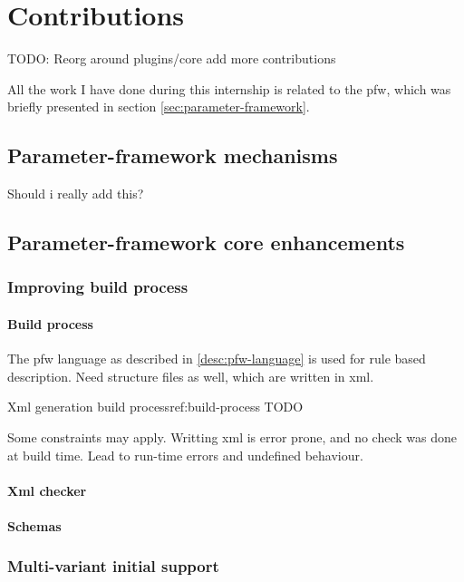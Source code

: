 \chapter{Contributions}\label{chap:contributions}

TODO:
Reorg around plugins/core add more contributions

\begin{sectionIntro}
    All the work I have done during this internship is related
    to the \gls{pfw}, which was briefly presented in section \ref{sec:parameter-framework}.
\end{sectionIntro}

\section{Parameter-framework mechanisms}
Should i really add this?

\section{Parameter-framework core enhancements}

\subsection{Improving build process}
\subsubsection{Build process}
The pfw language as described in \ref{desc:pfw-language} is used for rule based
description. Need structure files as well, which are written in \gls{xml}.

\begin{figureGraphics}{Xml generation build process}{ref:build-process}
    TODO
\end{figureGraphics}

Some constraints may apply. Writting \gls{xml} is error prone, and no check was done at
build time. Lead to run-time errors and undefined behaviour.
\subsubsection{Xml checker}
\subsubsection{Schemas}


\subsection{Multi-variant initial support}
